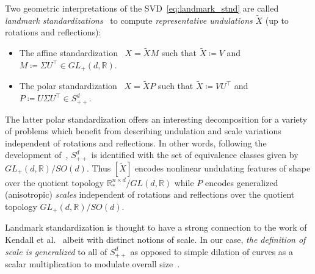 \documentclass[pdflatex,iicol]{sn-jnl}%
\theoremstyle{thmstyleone}%
\theoremstyle{thmstyletwo}%
\theoremstyle{thmstylethree}%
\begin{document}
Two geometric interpretations of the SVD~\eqref{eq:landmark_stnd} are called \emph{landmark standardizations}~\cite{bryner20142d, grey2023separable, srivastava2016functional} to compute \textit{representative undulations} $\widetilde{X}$ (up to rotations and reflections):

\begin{itemize}
    \item The affine standardization~\cite{bryner20142d} $X = \widetilde{X}M$ such that 
    $\widetilde{X} \coloneqq V$ and $ M \coloneqq \Sigma U^{\top} \in GL_+(d,\mathbb{R})$.
    \item The polar standardization~\cite{grey2023separable} $X = \widetilde{X}P$ such that
    $\widetilde{X} \coloneqq VU^{\top}$ and $P \coloneqq U\Sigma U^{\top}\in S^d_{++}$.
\end{itemize}
The latter polar standardization offers an interesting decomposition for a variety of problems which benefit from describing undulation and scale variations independent of rotations and reflections. In other words, following the development of~\cite{fletcher2003statistics}, $S^d_{++}$ is identified with the set of equivalence classes given by $GL_+(d,\mathbb{R})/SO(d)$. Thus $[\widetilde{X}]$ encodes nonlinear undulating features of shape over the quotient topology $\mathbb{R}^{n \times d}_*/GL(d,\mathbb{R})$ while $P$ encodes generalized (anisotropic) \emph{scales} independent of rotations and reflections over the quotient topology $GL_+(d,\mathbb{R})/SO(d)$.

Landmark standardization is thought to have a strong connection to the work of Kendall et al.~\cite{kendall2009shape} albeit with distinct notions of scale. In our case, \emph{the definition of scale is generalized} to all of $S^d_{++}$ as opposed to simple dilation of curves as a scalar multiplication to modulate overall size~\cite{srivastava2010shape, kendall2009shape, srivastava2016functional}. 
\end{document}
